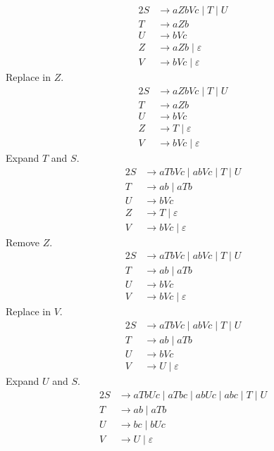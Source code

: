 \documentclass[docid=PA09]{tcom_PA}
\begin{document}
\setcounter{chapter}{8}
{

\begin{alignat*}{2}
	S &\rightarrow aZbVc\mid T\mid U\\
	T &\rightarrow aZb\\
	U &\rightarrow bVc\\
	Z &\rightarrow aZb\mid \varepsilon \\
	V &\rightarrow bVc\mid \varepsilon
\end{alignat*}
Replace in $Z$.
\begin{alignat*}{2}
	S &\rightarrow aZbVc\mid T\mid U\\
	T &\rightarrow aZb\\
	U &\rightarrow bVc\\
	Z &\rightarrow T\mid \varepsilon \\
	V &\rightarrow bVc\mid \varepsilon
\end{alignat*}
Expand $T$ and $S$.
\begin{alignat*}{2}
	S &\rightarrow aTbVc\mid abVc\mid T\mid U\\
	T &\rightarrow ab\mid aTb\\
	U &\rightarrow bVc\\
	Z &\rightarrow T\mid \varepsilon \\
	V &\rightarrow bVc\mid \varepsilon
\end{alignat*}
Remove $Z$.
\begin{alignat*}{2}
	S &\rightarrow aTbVc\mid abVc\mid T\mid U\\
	T &\rightarrow ab\mid aTb\\
	U &\rightarrow bVc\\
	V &\rightarrow bVc\mid \varepsilon
\end{alignat*}
Replace in $V$.
\begin{alignat*}{2}
	S &\rightarrow aTbVc\mid abVc\mid T\mid U\\
	T &\rightarrow ab\mid aTb\\
	U &\rightarrow bVc\\
	V &\rightarrow U\mid \varepsilon
\end{alignat*}
Expand $U$ and $S$.
\begin{alignat*}{2}
	S &\rightarrow aTbUc\mid aTbc\mid abUc\mid abc\mid T\mid U\\
	T &\rightarrow ab\mid aTb\\
	U &\rightarrow bc\mid bUc\\
	V &\rightarrow U\mid \varepsilon
\end{alignat*}
}
\end{document}
